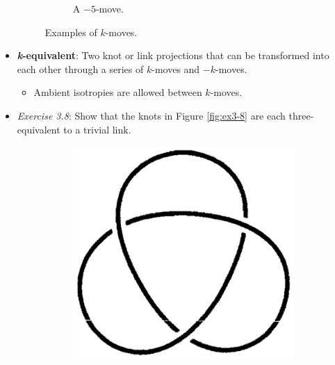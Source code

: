 \documentclass[titlepage]{article}
\numberwithin{figure}{section}
\numberwithin{table}{section}
\numberwithin{equation}{section}
\begin{document}
\begin{itemize}
\begin{figure}[h!]
\begin{subfigure}[b]{0.2\linewidth}
            \caption{A $-5$-move.}
            \label{fig:k-movesb}
        \end{subfigure}
        \caption{Examples of $k$-moves.}
        \label{fig:k-moves}
    \end{figure}
    \item \textbf{\emph{k}-equivalent}: Two knot or link projections that can be transformed into each other through a series of $k$-moves and $-k$-moves.
    \begin{itemize}
        \item Ambient isotropies are allowed between $k$-moves.
    \end{itemize}
    \item \emph{Exercise 3.8}: Show that the knots in Figure \ref{fig:ex3-8} are each three-equivalent to a trivial link.
    \begin{figure}[h!]
        \centering
        \begin{subfigure}[b]{0.3\linewidth}
            \centering
            \includegraphics[width=0.5\linewidth]{Blender/ex3-8a.png}

\end{subfigure}
\end{figure}
\end{itemize}
\end{document}
